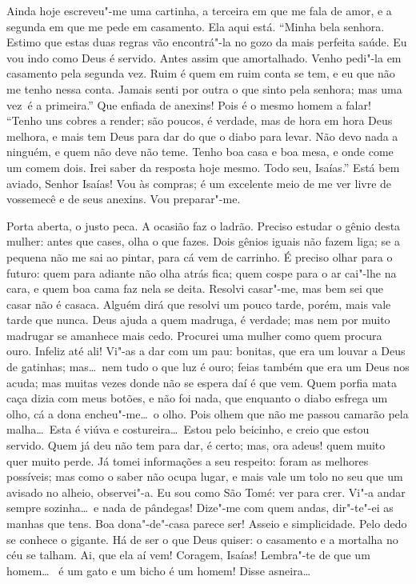 Ainda hoje escreveu"-me uma cartinha, a terceira em que me fala de amor, e a
segunda em que me pede em casamento. 
Ela aqui está.  “Minha bela senhora. Estimo que estas duas regras vão
encontrá"-la no gozo da mais perfeita saúde. Eu vou indo como Deus é servido.
Antes assim que amortalhado. Venho pedi"-la em casamento pela segunda vez. Ruim é
quem em ruim conta se tem, e eu que não me tenho nessa conta. Jamais senti por
outra o que sinto pela senhora; mas uma \mbox{vez é} a primeira.” 
Que enfiada de anexins! Pois é o mesmo homem a falar!  “Tenho uns cobres a render; são poucos, é verdade, mas de hora em hora
Deus melhora, e mais tem Deus para dar do que o diabo para levar. Não devo nada a ninguém, e quem não
deve não teme. Tenho boa casa e boa mesa, e onde come um comem dois. Irei saber
da resposta hoje mesmo. Todo seu,
Isaías.”  Está bem aviado, Senhor Isaías!  Vou às
compras; é um excelente meio de me ver livre de vossemecê e de seus
anexins. Vou preparar"-me. 


\stagedir{\textsc{[Isaías]}}

  Porta
aberta, o justo peca.
 A ocasião faz o ladrão. Preciso estudar o
gênio desta mulher: antes que cases, olha o que fazes. Dois gênios iguais não
fazem liga; se a pequena não me sai ao pintar, para cá vem de carrinho. É
preciso olhar para o futuro: quem para adiante não olha atrás fica; quem cospe
para o ar cai"-lhe na cara, e quem boa cama faz nela se deita. Resolvi casar"-me,
mas bem sei que casar não é casaca. Alguém dirá que resolvi um pouco tarde,
porém, mais vale tarde que nunca. Deus ajuda a quem madruga, é verdade; mas nem
por muito madrugar se amanhece mais cedo. Procurei uma mulher como quem procura
ouro. Infeliz até ali! Vi"-as a dar com um pau: bonitas, que era um louvar a Deus
de gatinhas; mas\ldots\ nem tudo o que luz é ouro; feias também que era um Deus
nos acuda; mas muitas vezes donde não se espera daí é que vem. Quem porfia mata
caça dizia com meus botões, e não foi nada, que enquanto o diabo esfrega um
olho, cá a dona encheu"-me\ldots\ o olho. Pois olhem que não me passou camarão
pela malha\ldots\ Esta é viúva e costureira\ldots\ Estou pelo beicinho, e creio
que estou servido. Quem já deu não tem para dar, é certo; mas, ora adeus!
quem muito quer muito perde. Já tomei informações a seu respeito: foram as
melhores possíveis; mas como o saber não ocupa lugar, e mais vale um tolo no seu
que um avisado no alheio, observei"-a. Eu sou como
São Tomé: ver para crer. Vi"-a andar sempre sozinha\ldots\ e nada de pândegas!
Dize"-me com quem andas, dir"-te"-ei as manhas que tens.
 Boa dona"-de"-casa parece ser! Asseio e simplicidade.
Pelo dedo se conhece o gigante. Há de ser o que Deus quiser: o casamento e a
mortalha no céu se talham.  Ai, que ela aí vem!
 Coragem, Isaías! Lembra"-te de que um homem\ldots\
 é um gato e um bicho é um homem!
Disse asneira\ldots


